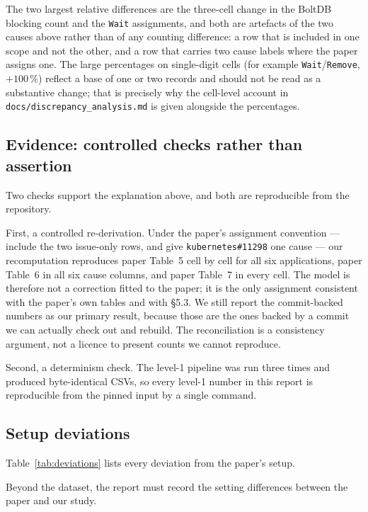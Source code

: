 \documentclass[11pt]{article}
\begin{document}
The two largest relative differences are the three-cell change in the
BoltDB blocking count and the \texttt{Wait} assignments, and both are
artefacts of the two causes above rather than of any counting difference: a
row that is included in one scope and not the other, and a row that carries
two cause labels where the paper assigns one. The large percentages on
single-digit cells (for example \texttt{Wait}/\texttt{Remove}, $+100\,\%$)
reflect a base of one or two records and should not be read as a
substantive change; that is precisely why the cell-level account in
\texttt{docs/discrepancy\_analysis.md} is given alongside the percentages.

\subsection{Evidence: controlled checks rather than assertion}

Two checks support the explanation above, and both are reproducible from the
repository.

First, a controlled re-derivation. Under the paper's assignment convention
--- include the two issue-only rows, and give \texttt{kubernetes\#11298} one
cause --- our recomputation reproduces paper Table~5 cell by cell for all
six applications, paper Table~6 in all six cause columns, and paper Table~7
in every cell. The model is therefore not a correction fitted to the paper;
it is the only assignment consistent with the paper's own tables and with
§5.3. We still report the commit-backed numbers as our primary result,
because those are the ones backed by a commit we can actually check out and
rebuild. The reconciliation is a consistency argument, not a licence to
present counts we cannot reproduce.

Second, a determinism check. The level-1 pipeline was run three times and
produced byte-identical CSVs, so every level-1 number in this report is
reproducible from the pinned input by a single command.

\subsection{Setup deviations}

Table~\ref{tab:deviations} lists every deviation from the
paper's setup.


Beyond the dataset, the report must record the setting differences between
the paper and our study.
\end{document}
